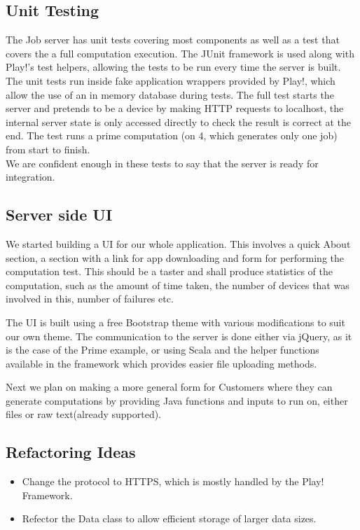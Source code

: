 \documentclass[a4paper,10pt]{article}
\begin{document}
\subsection{Unit Testing}

The Job server has unit tests covering most components as well as a test that covers the a full computation execution.
The JUnit framework is used along with Play!'s test helpers, allowing the tests to be run every time the server is built.\\
The unit tests run inside fake application wrappers provided by Play!, which allow the use of an in memory database during tests.
The full test starts the server and pretends to be a device by making HTTP requests to localhost,
the internal server state is only accessed directly to check the result is correct at the end.
The test runs a prime computation (on 4, which generates only one job) from start to finish.\\

We are confident enough in these tests to say that the server is ready for integration.

\subsection{Server side UI}
We started building a UI for our whole application. This involves a quick About section, a section with a link for app downloading and form for performing the computation test. This should be a taster and shall produce statistics of the computation, such as the amount of time taken, the number of devices that was involved in this, number of failures etc. 

The UI is built using a free Bootstrap theme with various modifications to suit our own theme. The communication to the server is done either via jQuery, as it is the case of the Prime example, or using Scala and the helper functions available in the framework which provides easier file uploading methods. 

Next we plan on making a more general form for Customers where they can generate computations by providing Java functions and inputs to run on, either files or raw text(already supported).

\subsection{Refactoring Ideas}

\begin{itemize}
\item Change the protocol to HTTPS, which is mostly handled by the Play! Framework.
\item Refector the Data class to allow efficient storage of larger data sizes.
\end{itemize}
\end{document}
